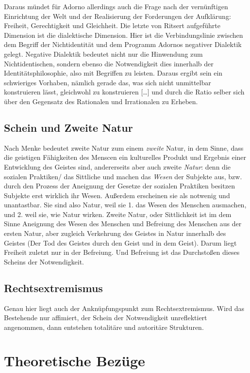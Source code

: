 \documentclass[a4paper, 12pt]{scrartcl}
\begin{document}
    Daraus mündet für Adorno allerdings auch die Frage nach der vernünftigen Einrichtung der Welt und der Realisierung der Forderungen der Aufklärung: Freiheit, Gerechtigkeit und Gleichheit. 
    Die letzte von Ritsert aufgeführte Dimension ist die dialektische Dimension. Hier ist die Verbindungslinie zwischen dem Begriff der Nichtidentität und dem Programm Adornos negativer Dialektik gelegt. 
    Negative Dialektik bedeutet nicht nur die Hinwendung zum Nichtidentischen, sondern ebenso die Notwendigkeit dies innerhalb der Identitätsphilosophie, also mit Begriffen zu leisten. 
    Daraus ergibt sein ein schwieriges Vorhaben, \glqq nämlich gerade das, was sich nicht unmittelbar konstruieren lässt, gleichwohl zu konstruieren […] und durch die Ratio selber sich über den Gegensatz des Rationalen und Irrationalen zu Erheben\grqq.

    \subsection{Schein und Zweite Natur} \label{zweite-natur}
    Nach Menke bedeutet zweite Natur zum einem \textit{zweite} Natur, in dem Sinne, dass die geistigen Fähigkeiten des Menscen ein kulturelles Produkt und Ergebnis einer Entwicklung des Geistes sind, andererseits aber auch zweite \textit{Natur}: denn die sozialen Praktiken/ das Sittliche und machen das \textit{Wesen} der Subjekte aus, bzw. durch den Prozess der Aneignung der Gesetze der sozialen Praktiken besitzen Subjekte erst wirklich ihr Wesen.
    Außerdem erscheinen sie als notwenig und unantastbar. 
    Sie sind also Natur, weil sie 1. das Wesen des Menschen ausmachen, und 2. weil sie, wie Natur wirken.
    Zweite Natur, oder Sittlichkeit ist im dem Sinne Aneignung des Wesen des Menschen und Befreiung des Menschen aus der ersten Natur, aber zugleich Verkehrung des Geistes in Natur innerhalb des Geistes (Der Tod des Geistes durch den Geist und in dem Geist).
    Darum liegt Freiheit zuletzt nur in der Befreiung. Und Befreiung ist das Durchstoßen dieses Scheins der Notwendigkeit.

    \subsection{Rechtsextremismus}
    Genau hier liegt auch der Anknüpfungspunkt zum Rechtsextremismus. 
    Wird das Bestehende nur affimiert, der Schein der Notwendigkeit unreflektiert angenommen, dann entstehen totalitäre und autoritäre Strukturen. 


    \section{Theoretische Bezüge}
\end{document}
